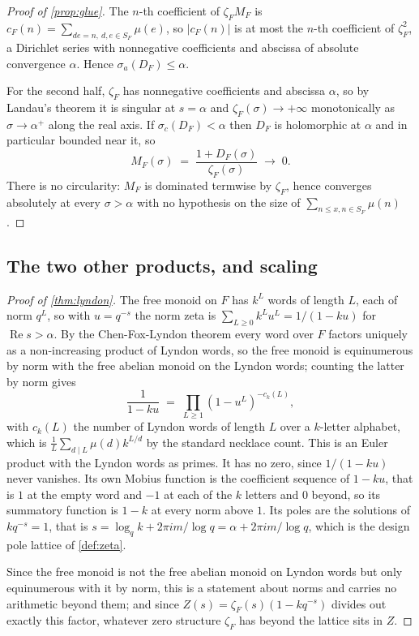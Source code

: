 \documentclass[11pt]{amsart}
\theoremstyle{definition}
\theoremstyle{remark}
\begin{document}
\begin{proof}[Proof of \cref{prop:glue}]
The $n$-th coefficient of $\zeta_{F}M_{F}$ is $c_{F}(n) = \sum_{de=n,\ d,e \in S_{F}}\mu(e)$, so $|c_{F}(n)|$ is at most the $n$-th coefficient of $\zeta_{F}^{2}$, a Dirichlet series with nonnegative coefficients and abscissa of absolute convergence $\alpha$. Hence $\sigma_{a}(D_{F}) \le \alpha$.

For the second half, $\zeta_{F}$ has nonnegative coefficients and abscissa $\alpha$, so by Landau's theorem it is singular at $s = \alpha$ and $\zeta_{F}(\sigma) \to +\infty$ monotonically as $\sigma \to \alpha^{+}$ along the real axis. If $\sigma_{c}(D_{F}) < \alpha$ then $D_{F}$ is holomorphic at $\alpha$ and in particular bounded near it, so
\[
  M_{F}(\sigma) \;=\; \frac{1 + D_{F}(\sigma)}{\zeta_{F}(\sigma)} \;\longrightarrow\; 0 .
\]
There is no circularity: $M_{F}$ is dominated termwise by $\zeta_{F}$, hence converges absolutely at every $\sigma > \alpha$ with no hypothesis on the size of $\sum_{n \le x, n \in S_{F}} \mu(n)$.
\end{proof}

\subsection{The two other products, and scaling}
\label{sub:proof-products}

\begin{proof}[Proof of \cref{thm:lyndon}]
The free monoid on $F$ has $k^{L}$ words of length $L$, each of norm $q^{L}$, so with $u = q^{-s}$ the norm zeta is $\sum_{L \ge 0} k^{L} u^{L} = 1/(1-ku)$ for $\operatorname{Re} s > \alpha$. By the Chen-Fox-Lyndon theorem every word over $F$ factors uniquely as a non-increasing product of Lyndon words, so the free monoid is equinumerous by norm with the free abelian monoid on the Lyndon words; counting the latter by norm gives
\[
  \frac{1}{1-ku} \;=\; \prod_{L \ge 1}\left(1-u^{L}\right)^{-c_{k}(L)},
\]
with $c_{k}(L)$ the number of Lyndon words of length $L$ over a $k$-letter alphabet, which is $\frac{1}{L}\sum_{d \mid L}\mu(d)k^{L/d}$ by the standard necklace count. This is an Euler product with the Lyndon words as primes. It has no zero, since $1/(1-ku)$ never vanishes. Its own Mobius function is the coefficient sequence of $1 - ku$, that is $1$ at the empty word and $-1$ at each of the $k$ letters and $0$ beyond, so its summatory function is $1 - k$ at every norm above $1$. Its poles are the solutions of $kq^{-s} = 1$, that is $s = \log_{q}k + 2\pi i m/\log q = \alpha + 2\pi i m /\log q$, which is the design pole lattice of \cref{def:zeta}.

Since the free monoid is not the free abelian monoid on Lyndon words but only equinumerous with it by norm, this is a statement about norms and carries no arithmetic beyond them; and since $Z(s) = \zeta_{F}(s)(1-kq^{-s})$ divides out exactly this factor, whatever zero structure $\zeta_{F}$ has beyond the lattice sits in $Z$.
\end{proof}
\end{document}
